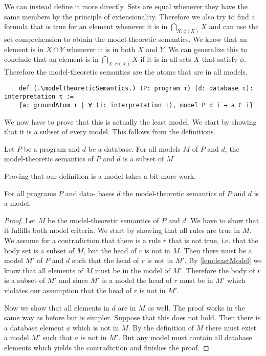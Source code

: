 We can instead define it more directly. Sets are equal whenever they have the same members by the principle of extensionality. Therefore we also try to find a formula that is true for an element whenever it is in $\bigcap_{X: \phi(X) } X $ and can use the set comprehension to obtain the model-theoretic semantics. We know that an element is in $X \cap Y$ whenever it is in both $X$ and $Y$. We can generalize this to conclude that an element is in $\bigcap_{X: \phi(X) } X $ if it is in all sets $X$ that satisfy $\phi$. Therefore the model-theoretic semantics are the atoms that are in all models.

\begin{lstlisting}
    def (.\modelTheoreticSemantics.) (P: program τ) (d: database τ): interpretation τ := 
    {a: groundAtom τ | ∀ (i: interpretation τ), model P d i → a ∈ i}
\end{lstlisting}

We now have to prove that this is actually the least model. We start by showing that it is a subset of every model. This follows from the definitions.

\begin{lemma}[\leastModel]\label{lem:leastModel}
    Let $P$ be a program and $d$ be a database. For all models $M$ of $P$ and $d$, the model-theoretic semantics of $P$ and $d$ is a subset of $M$
\end{lemma}

Proving that our definition is a model takes a bit more work.

\begin{lemma}[\modelTheoreticSemanticsIsModel]\label{lem:modelMTS}
    For all programs $P$ and data- bases $d$ the model-theoretic semantics of $P$ and $d$ is a model.
\end{lemma}
\begin{proof}
    Let $M$ be the model-theoretic semantics of $P$ and $d$. We have to show that it fulfills both model criteria.
    We start by showing that all rules are true in $M$. We assume for a contradiction that there is a rule $r$ that is not true, i.e. that the body set is a subset of $M$, but the head of $r$ is not in $M$. Then there must be a model $M'$ of $P$ and $d$ such that the head of $r$ is not in $M'$. By \cref{lem:leastModel} we know that all elements of $M$ must be in the model of $M'$. Therefore the body of $r$ is a subset of $M'$ and since $M'$ is a model the head of $r$ must be in $M'$ which violates our assumption that the head of $r$ is not in $M'$.

    Now we show that all elements in $d$ are in $M$ as well. The proof works in the same way as before but is simpler. Suppose that this does not hold. Then there is a database element $a$ which is not in $M$. By the definition of $M$ there must exist a model $M'$ such that $a$ is not in $M'$. But any model must contain all database elements which yields the contradiction and finishes the proof.
\end{proof}

